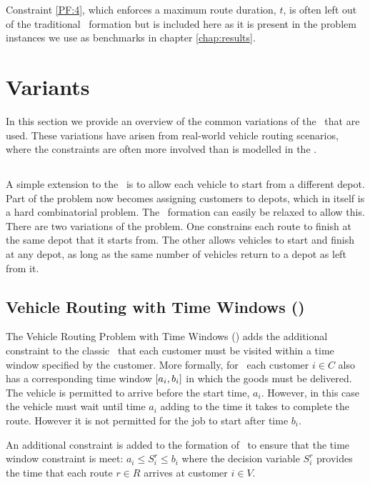 Constraint \eqref{PF:4}, which enforces a maximum route duration, $t$, is often left out of the traditional \CVRP\ formation but is included here as it is present in the problem instances we use as benchmarks in chapter \ref{chap:results}.

\section{Variants}
\label{sec:variants}

In this section we provide an overview of the common variations of the \VRP\ that are used. These variations have arisen from real-world vehicle routing scenarios, where the constraints are often more involved than is modelled in the \CVRP. 

\subsection{\MDVRP}

A simple extension to the \CVRP\ is to allow each vehicle to start from a different depot. Part of the problem now becomes assigning customers to depots, which in itself is a hard combinatorial problem. The \CVRP\ formation can easily be relaxed to allow this. There are two variations of the problem. One constrains each route to finish at the same depot that it starts from. The other allows vehicles to start and finish at any depot, as long as the same number of vehicles return to a depot as left from it.

\subsection{Vehicle Routing with Time Windows (\VRPTW)}

The Vehicle Routing Problem with Time Windows (\VRPTW) adds the additional constraint to the classic \VRP\ that each customer must be visited within a time window specified by the customer. More formally, for \VRPTW\ each customer $i \in C$ also has a corresponding time window $[a_i, b_i]$ in which the goods must be delivered. The vehicle is permitted to arrive before the start time, $a_i$. However, in this case the vehicle must wait until time $a_i$ adding to the time it takes to complete the route. However it is not permitted for the job to start after time $b_i$.

An additional constraint is added to the formation of \CVRP\ to ensure that the time window constraint is meet: $a_i \leq S_i^r \leq b_i$ where the decision variable $S_i^r$ provides the time that each route $r \in R$ arrives at customer $i \in V$.  


